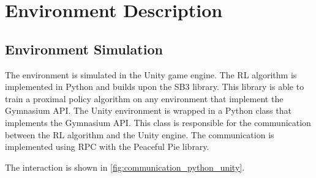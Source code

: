 \section{Environment Description}
\label{cha:env_description}

\subsection{Environment Simulation}
\label{sec:env_simulation}

The environment is simulated in the Unity game engine. The \ac{RL} algorithm is implemented in Python and builds upon the \ac{SB3} library. This library is able to train a proximal policy algorithm on any environment that implement the Gymnasium API. The Unity environment is wrapped in a Python class that implements the Gymnasium API. This class is responsible for the communication between the \ac{RL} algorithm and the Unity engine. The communication is implemented using \ac{RPC} with the Peaceful Pie \textcite{peacefulpie} library.

The interaction is shown in \ref{fig:communication_python_unity}.

\newcommand{\arenaImg}[1]{\texttt{[image: Bilder/image\_printer\_images/agent\_interaction/step\_\#1\_arena.png]}}
\newcommand{\agentImg}[1]{\texttt{[image: Bilder/image\_printer\_images/agent\_interaction/step\_\#1\_image\_from\_unity.png]}}

\newcommand\yOffsetc{-6.5}
\newcommand\xOffsetc{4.5}
\newcommand\envWidth{12}

\usetikzlibrary{decorations.pathreplacing}

